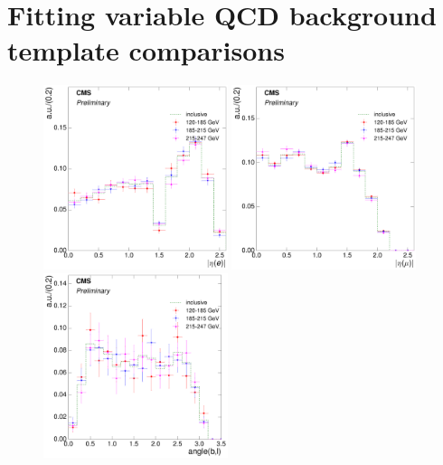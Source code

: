 \clearpage


\section{Fitting variable QCD background template comparisons}
\label{as:fitting_variable_QCD_template_comparisons}

\begin{figure}[hbtp]
    \centering
     \includegraphics[width=0.48\textwidth]{Chapters/04_Analysis/04b_XSections/images/8TeV/fit_variables/electron/HT/electron_absolute_eta/qcd/HT_electron_absolute_eta_0orMoreBtag_QCD_template_comparison.pdf}\hfill
     \includegraphics[width=0.48\textwidth]{Chapters/04_Analysis/04b_XSections/images/8TeV/fit_variables/muon/HT/muon_absolute_eta/qcd/HT_muon_absolute_eta_0orMoreBtag_QCD_template_comparison.pdf}\\
     \includegraphics[width=0.48\textwidth]{Chapters/04_Analysis/04b_XSections/images/8TeV/fit_variables/electron/HT/angle_bl/qcd/HT_angle_bl_1orMoreBtag_QCD_template_comparison.pdf}\hfill

\end{figure}
